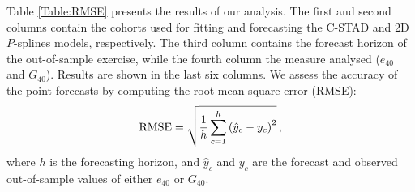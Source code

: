 \documentclass[11pt, a4paper]{article}
\begin{document}

Table \ref{Table:RMSE} presents the results of our analysis. The first and second columns contain the cohorts used for fitting and forecasting the C-STAD and 2D $P$-splines models, respectively. The third column contains the forecast horizon of the out-of-sample exercise, while the fourth column the measure analysed ($e_{40}$ and $G_{40}$). Results are shown in the last {\color{red}six} columns. We assess the accuracy of the point forecasts by computing the root mean square error (RMSE):
%
\begin{equation}\label{Eq:RMSE}
\mathrm{RMSE}=\sqrt{\frac{1}{h} \sum_{c=1}^{h} \left(\hat{y}_c-y_c\right)^2} \, , \notag
\end{equation} 
%
where $h$ is the forecasting horizon, and $\hat{y}_c$ and $y_c$ are the forecast and observed out-of-sample values of either $e_{40}$ or $G_{40}$. 
\end{document}
